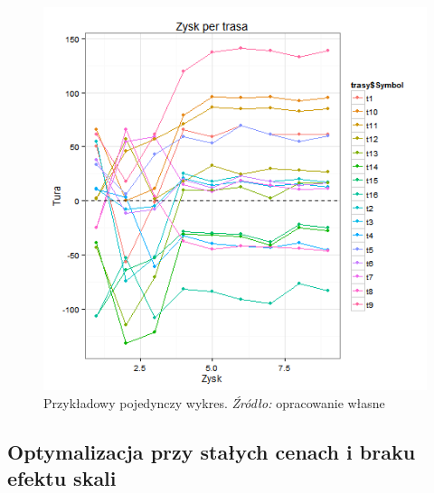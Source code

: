 \documentclass[polish, twoside, 12pt, a4paper]{article}
\theoremstyle{definition}
\theoremstyle{plain}
\theoremstyle{remark}
\begin{document}
\begin{figure}[hbt]
  \centering
    \includegraphics[width=\textwidth]{pictures/brak_algorytmu/trasy2.png}
  \captionsetup{margin=10pt,font=small,labelfont=bf,width=.8\textwidth}
  \caption[Krótka nazwa X]{Przykładowy pojedynczy wykres. \textit{Źródło:} opracowanie własne}\label{fig:brak3}
\end{figure}


\subsection{Optymalizacja przy stałych cenach i braku efektu skali}
\end{document}

